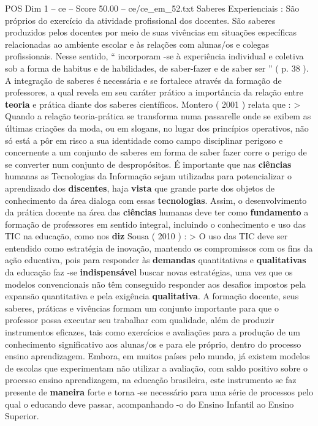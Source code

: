\begin{textsample}{POS Dim 1 – ce – Score 50.00 – ce/ce\_em\_52.txt}
Saberes Experienciais : São próprios do exercício da atividade profissional dos docentes.
São saberes produzidos pelos docentes por meio de suas vivências em situações específicas relacionadas ao ambiente escolar e às relações com alunas/os e colegas profissionais.
Nesse sentido, “ incorporam -se à experiência individual e coletiva sob a forma de habitus e de habilidades, de saber-fazer e de saber ser ” ( p. 38 ).
A integração de saberes é necessária e se fortalece através da formação de professores, a qual revela em seu caráter prático a importância da relação entre \textbf{teoria} e prática diante dos saberes científicos.
Montero ( 2001 ) relata que : > Quando a relação teoria-prática se transforma numa passarelle onde se exibem as últimas criações da moda, ou em slogans, no lugar dos princípios operativos, não só está a pôr em risco a sua identidade como campo disciplinar perigoso e concernente a um conjunto de saberes em forma de saber fazer corre o perigo de se converter num conjunto de despropósitos.
É importante que nas \textbf{ciências} humanas as Tecnologias da Informação sejam utilizadas para potencializar o aprendizado dos \textbf{discentes}, haja \textbf{vista} que grande parte dos objetos de conhecimento da área dialoga com essas \textbf{tecnologias}.
Assim, o desenvolvimento da prática docente na área das \textbf{ciências} humanas deve ter como \textbf{fundamento} a formação de professores em sentido integral, incluindo o conhecimento e uso das TIC na educação, como nos \textbf{diz} Sousa ( 2010 ) : > O uso das TIC deve ser entendido como estratégia de inovação, mantendo os compromissos com os fins da ação educativa, pois para responder às \textbf{demandas} quantitativas e \textbf{qualitativas} da educação faz -se \textbf{indispensável} buscar novas estratégias, uma vez que os modelos convencionais não têm conseguido responder aos desafios impostos pela expansão quantitativa e pela exigência \textbf{qualitativa}.
A formação docente, seus saberes, práticas e vivências formam um conjunto importante para que o professor possa executar seu trabalhar com qualidade, além de produzir instrumentos eficazes, tais como exercícios e avaliações para a produção de um conhecimento significativo aos alunas/os e para ele próprio, dentro do processo ensino aprendizagem.
Embora, em muitos países pelo mundo, já existem modelos de escolas que experimentam não utilizar a avaliação, com saldo positivo sobre o processo ensino aprendizagem, na educação brasileira, este instrumento se faz presente de \textbf{maneira} forte e torna -se necessário para uma série de processos pelo qual o educando deve passar, acompanhando -o do Ensino Infantil ao Ensino Superior.

\end{textsample}
